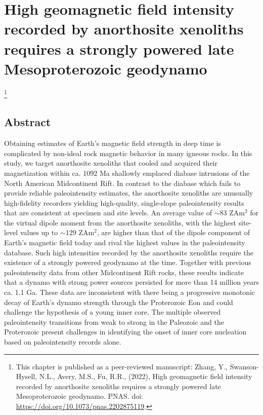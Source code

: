 \chapter[High geomagnetic field intensity recorded by anorthosite xenoliths requires a strongly powered late Mesoproterozoic geodynamo][Late Mesoproterozoic geodynamo]{High geomagnetic field intensity recorded by anorthosite xenoliths requires a strongly powered late Mesoproterozoic geodynamo}

\let\thefootnote\relax\footnote{This chapter is published as a peer-reviewed manuscript: Zhang, Y., Swanson-Hysell, N.L., Avery, M.S., Fu, R.R., (2022), High geomagnetic field intensity recorded by anorthosite xenoliths requires a strongly powered late Mesoproterozoic geodynamo. PNAS. doi: \url{https://doi.org/10.1073/pnas.2202875119}.}

\section{Abstract}
Obtaining estimates of Earth's magnetic field strength in deep time is complicated by non-ideal rock magnetic behavior in many igneous rocks. In this study, we target anorthosite xenoliths that cooled and acquired their magnetization within ca. 1092 Ma shallowly emplaced diabase intrusions of the North American Midcontinent Rift. In contrast to the diabase which fails to provide reliable paleointensity estimates, the anorthosite xenoliths are unusually high-fidelity recorders yielding high-quality, single-slope paleointensity results that are consistent at specimen and site levels. An average value of $\sim$83 ZAm$^2$ for the virtual dipole moment from the anorthosite xenoliths, with the highest site-level values up to $\sim$129 ZAm$^2$, are higher than that of the dipole component of Earth's magnetic field today and rival the highest values in the paleointensity database. Such high intensities recorded by the anorthosite xenoliths require the existence of a strongly powered geodynamo at the time. Together with previous paleointensity data from other Midcontinent Rift rocks, these results indicate that a dynamo with strong power sources persisted for more than 14 million years ca. 1.1 Ga. These data are inconsistent with there being a progressive monotonic decay of Earth's dynamo strength through the Proterozoic Eon and could challenge the hypothesis of a young inner core. The multiple observed paleointensity transitions from weak to strong in the Paleozoic and the Proterozoic present challenges in identifying the onset of inner core nucleation based on paleointensity records alone. 


